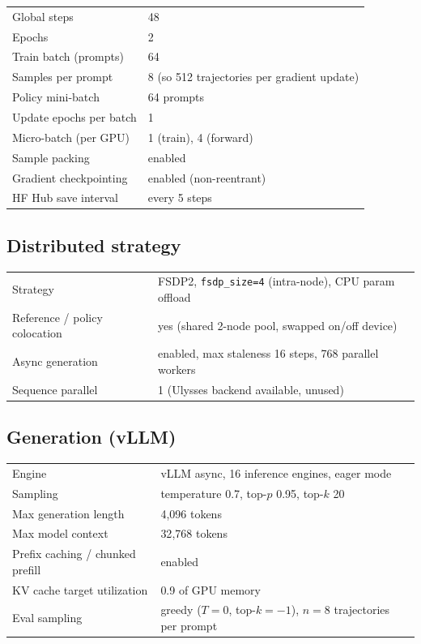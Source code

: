 \documentclass{article}
\begin{document}
\begin{tabular}{ll}
\toprule
Global steps             & 48 \\
Epochs                   & 2 \\
Train batch (prompts)    & 64 \\
Samples per prompt       & 8 (so 512 trajectories per gradient update) \\
Policy mini-batch        & 64 prompts \\
Update epochs per batch  & 1 \\
Micro-batch (per GPU)    & 1 (train), 4 (forward) \\
Sample packing           & enabled \\
Gradient checkpointing   & enabled (non-reentrant) \\
HF Hub save interval     & every 5 steps \\
\bottomrule
\end{tabular}

\subsection{Distributed strategy}

\begin{tabular}{ll}
\toprule
Strategy                         & FSDP2, \texttt{fsdp\_size=4} (intra-node), CPU param offload \\
Reference / policy colocation    & yes (shared 2-node pool, swapped on/off device) \\
Async generation                 & enabled, max staleness 16 steps, 768 parallel workers \\
Sequence parallel                & 1 (Ulysses backend available, unused) \\
\bottomrule
\end{tabular}

\subsection{Generation (vLLM)}

\begin{tabular}{ll}
\toprule
Engine                          & vLLM async, 16 inference engines, eager mode \\
Sampling                        & temperature 0.7, top-$p$ 0.95, top-$k$ 20 \\
Max generation length           & 4{,}096 tokens \\
Max model context               & 32{,}768 tokens \\
Prefix caching / chunked prefill & enabled \\
KV cache target utilization     & 0.9 of GPU memory \\
Eval sampling                   & greedy ($T=0$, top-$k=-1$), $n=8$ trajectories per prompt \\
\bottomrule
\end{tabular}
\end{document}
